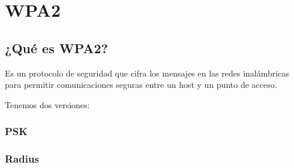 \chapter{WPA2}
\section{¿Qué es WPA2?} %
Es un protocolo de seguridad que cifra los mensajes en las redes inalámbricas para permitir comunicaciones seguras entre un host y un punto de acceso.

Tenemos dos versiones:

\subsection{PSK} %

\subsection{Radius} %

